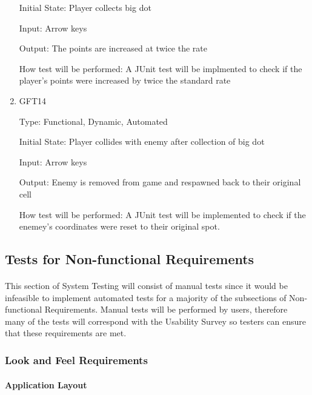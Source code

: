 \documentclass[12pt, titlepage]{article}
\begin{document}
\begin{enumerate}
Initial State: Player collects big dot
					
Input: Arrow keys
					
Output: The points are increased at twice the rate

How test will be performed: A JUnit test will be implmented to check if the player's points were increased by twice the standard rate

\item{GFT14\\}

Type: Functional, Dynamic, Automated
					
Initial State: Player collides with enemy after collection of big dot
					
Input: Arrow keys
					
Output: Enemy is removed from game and respawned back to their original cell

How test will be performed: A JUnit test will be implemented to check if the enemey's coordinates were reset to their original spot.

\end{enumerate}

\subsection{Tests for Non-functional Requirements}

\paragraph{}
This section of System Testing will consist of manual tests since it would be infeasible to implement automated tests for a majority of the subsections of Non-functional Requirements. Manual tests will be performed by users, therefore many of the tests will correspond with the Usability Survey so testers can ensure that these requirements are met.

\subsubsection{Look and Feel Requirements}
		
\paragraph{Application Layout}
\end{document}
